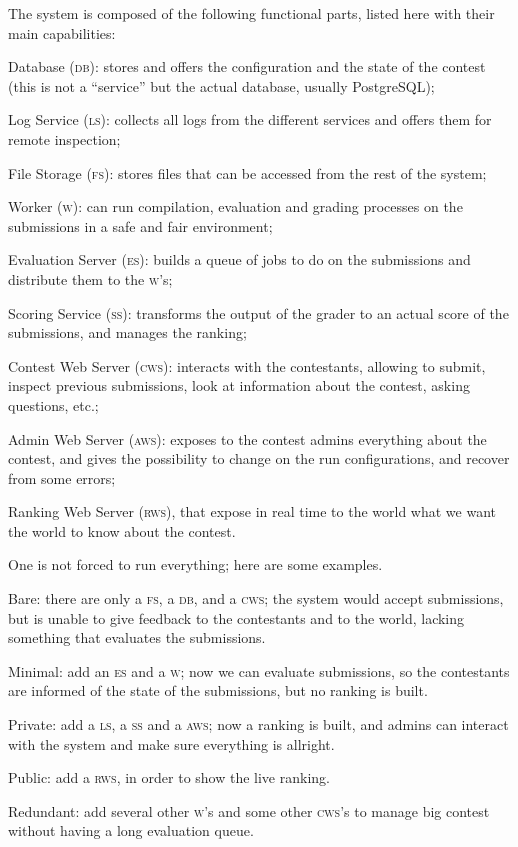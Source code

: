 \documentclass[a4paper,8pt]{amsart}
\newcommand{\DB}{\textsc{db}}
\newcommand{\LS}{\textsc{ls}}
\newcommand{\FS}{\textsc{fs}}
\newcommand{\ES}{\textsc{es}}
\newcommand{\WS}{\textsc{w}}
\renewcommand{\SS}{\textsc{ss}}
\newcommand{\CWS}{\textsc{cws}}
\newcommand{\AWS}{\textsc{aws}}
\newcommand{\RWS}{\textsc{rws}}
\newenvironment{squishlist}{%
  \begin{list}{\textbullet}%
    { \setlength{\itemsep}{0pt}%
      \setlength{\parsep}{3pt}%
      \setlength{\topsep}{3pt}%
      \setlength{\partopsep}{0pt}%
      \setlength{\leftmargin}{1.5em}%
      \setlength{\labelwidth}{1em}%
      \setlength{\labelsep}{0.5em} }%
}{\end{list}}
\begin{document}
\begin{multicols}{2}
  The system is composed of the following functional parts, listed
  here with their main capabilities:
  \begin{squishlist}
  \item Database (\DB{}): stores and offers the configuration and
    the state of the contest (this is not a ``service'' but the actual
    database, usually PostgreSQL);
  \item Log Service (\LS{}): collects all logs from the different
    services and offers them for remote inspection;
  \item File Storage (\FS{}): stores files that can be accessed from
    the rest of the system;
  \item Worker (\WS{}): can run compilation, evaluation and
    grading processes on the submissions in a safe and fair
    environment;
  \item Evaluation Server (\ES{}): builds a queue of jobs to do on the
    submissions and distribute them to the \WS{}'s;
  \item Scoring Service (\SS{}): transforms the output of the grader
    to an actual score of the submissions, and manages the ranking;
  \item Contest Web Server (\CWS{}): interacts with the contestants,
    allowing to submit, inspect previous submissions, look at
    information about the contest, asking questions, etc.;
  \item Admin Web Server (\AWS{}): exposes to the contest admins
    everything about the contest, and gives the possibility to change
    on the run configurations, and recover from some errors;
  \item Ranking Web Server (\RWS{}), that expose in real time to the
    world what we want the world to know about the contest.
  \end{squishlist}

  One is not forced to run everything; here are some examples.
  \begin{squishlist}
  \item Bare: there are only a \FS{}, a \DB{}, and a \CWS{}; the
    system would accept submissions, but is unable to give feedback to
    the contestants and to the world, lacking something that evaluates
    the submissions.
  \item Minimal: add an \ES{} and a \WS{}; now we can evaluate
    submissions, so the contestants are informed of the state of the
    submissions, but no ranking is built.
  \item Private: add a \LS{}, a \SS{} and a \AWS{}; now a ranking is
    built, and admins can interact with the system and make sure
    everything is allright.
  \item Public: add a \RWS{}, in order to show the live ranking.
  \item Redundant: add several other \WS{}'s and some other \CWS{}'s
    to manage big contest without having a long evaluation queue.
  \end{squishlist}


\end{multicols}
\end{document}
